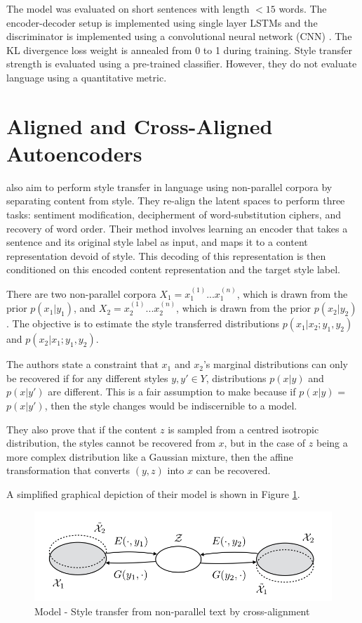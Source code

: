 The model was evaluated on short sentences with length $<15$ words. The encoder-decoder setup is implemented using single layer LSTMs and the discriminator is implemented using a convolutional neural network (CNN) \citep{hu2016harnessing}. The KL divergence loss weight is annealed from 0 to 1 during training. Style transfer strength is evaluated using a pre-trained classifier. However, they do not evaluate language using a quantitative metric.


\section{Aligned and Cross-Aligned Autoencoders}

\cite{shen2017style} also aim to perform style transfer in language using non-parallel corpora by separating content from style. They re-align the latent spaces to perform three tasks: sentiment modification, decipherment of word-substitution ciphers, and recovery of word order. Their method involves learning an encoder that takes a sentence and its original style label as input, and maps it to a content representation devoid of style. This decoding of this representation is then conditioned on this encoded content representation and the target style label.

There are two non-parallel corpora $X_1 = {x_1^{(1)} ... x_1^{(n)}}$, which is drawn from the prior $p(x_1|y_1)$, and $X_2 = {x_2^{(1)} ... x_2^{(n)}}$, which is drawn from the prior $p(x_2|y_2)$. The objective is to estimate the style transferred distributions $p(x_1|x_2;y_1,y_2)$ and $p(x_2|x_1;y_1,y_2)$.

The authors state a constraint that $x_1$ and $x_2$'s marginal distributions can only be recovered if for any different styles $y, y' \in Y$, distributions $p(x|y)$ and $p(x|y')$ are different. This is a fair assumption to make because if $p(x|y)$ = $p(x|y')$, then the style changes would be indiscernible to a model.

They also prove that if the content $z$ is sampled from a centred isotropic distribution, the styles cannot be recovered from $x$, but in the case of $z$ being a more complex distribution like a Gaussian mixture, then the affine transformation that converts $(y, z)$ into $x$ can be recovered.

A simplified graphical depiction of their model is shown in Figure \ref{fig:stca-architecture}.

\begin{figure}[ht]
	\centering
	\includegraphics[width=\textwidth]{images/stca-architecture}
	\caption{\label{fig:stca-architecture} Model - Style transfer from non-parallel text by cross-alignment}
\end{figure}

